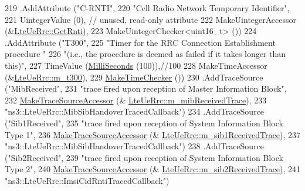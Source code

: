 \begin{DoxyCode}
219     .AddAttribute (\textcolor{stringliteral}{"C-RNTI"},
220                    \textcolor{stringliteral}{"Cell Radio Network Temporary Identifier"},
221                    UintegerValue (0), \textcolor{comment}{// unused, read-only attribute}
222                    MakeUintegerAccessor (&\hyperlink{classns3_1_1LteUeRrc_a5d7fad482ff68a116c0bab7433c816ec}{LteUeRrc::GetRnti}),
223                    MakeUintegerChecker<uint16\_t> ())
224     .AddAttribute (\textcolor{stringliteral}{"T300"},
225                    \textcolor{stringliteral}{"Timer for the RRC Connection Establishment procedure "}
226                    \textcolor{stringliteral}{"(i.e., the procedure is deemed as failed if it takes longer than this)"},
227                    TimeValue (\hyperlink{group__timecivil_gaf26127cf4571146b83a92ee18679c7a9}{MilliSeconds} (100)),\textcolor{comment}{//100}
228                    MakeTimeAccessor (&\hyperlink{classns3_1_1LteUeRrc_ab69b12ce9b9d4088e626dbca0a21bc0a}{LteUeRrc::m\_t300}),
229                    \hyperlink{group__time_ga7032965bd4afa578691d88c09e4481c1}{MakeTimeChecker} ())
230     .AddTraceSource (\textcolor{stringliteral}{"MibReceived"},
231                      \textcolor{stringliteral}{"trace fired upon reception of Master Information Block"},
232                      \hyperlink{group__tracing_gab21a770b9855af4e8f69f7531ea4a6b0}{MakeTraceSourceAccessor} (&
      \hyperlink{classns3_1_1LteUeRrc_a1bca18358e1230c8ac2f83a8a5d735b2}{LteUeRrc::m\_mibReceivedTrace}),
233                      \textcolor{stringliteral}{"ns3::LteUeRrc::MibSibHandoverTracedCallback"})
234     .AddTraceSource (\textcolor{stringliteral}{"Sib1Received"},
235                      \textcolor{stringliteral}{"trace fired upon reception of System Information Block Type 1"},
236                      \hyperlink{group__tracing_gab21a770b9855af4e8f69f7531ea4a6b0}{MakeTraceSourceAccessor} (&
      \hyperlink{classns3_1_1LteUeRrc_a6c744274b24e206588a34dc05ca983ff}{LteUeRrc::m\_sib1ReceivedTrace}),
237                      \textcolor{stringliteral}{"ns3::LteUeRrc::MibSibHandoverTracedCallback"})
238     .AddTraceSource (\textcolor{stringliteral}{"Sib2Received"},
239                      \textcolor{stringliteral}{"trace fired upon reception of System Information Block Type 2"},
240                      \hyperlink{group__tracing_gab21a770b9855af4e8f69f7531ea4a6b0}{MakeTraceSourceAccessor} (&
      \hyperlink{classns3_1_1LteUeRrc_a9fc4a1a9138bae6f5192d0b716ca3da0}{LteUeRrc::m\_sib2ReceivedTrace}),
241                      \textcolor{stringliteral}{"ns3::LteUeRrc::ImsiCidRntiTracedCallback"})

\end{DoxyCode}
